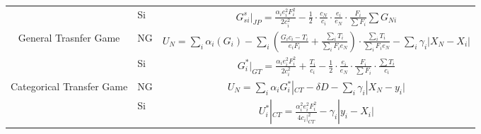 \begin{itemize}
\begin{table}[htbp]
\begin{tabular}{clc}
        \cmidrule{2-3}                                             & \multicolumn{1}{l}{\multirow{2}[2]{*}{Si}} & \multirow{2}[2]{*}{$G_{si}^{s}|_{JP}=\frac{\alpha_ie_i^2F_i^2}{2c_i^2}-\frac{1}{2}\cdot\frac{c_N}{c_i}\cdot\frac{e_i}{e_N}\cdot\frac{F_i}{\sum F_i}\sum G_{Ni}$}           \\
                                                                   &                                            &                                                                                                                                                                            \\
        \midrule
        \multirow{3}[4]{*}{General Trasnfer Game}                  & \multicolumn{1}{p{2.855em}}{NG}            & $U_N=\sum_i \alpha_i(G_i)-\sum_i(\frac{G_ic_i-T_i}{e_iF_i}+\frac{\sum_iT_i}{\sum_iF_ie_N})\cdot \frac{\sum_iT_i}{\sum_iF_ie_N}-\sum_i \gamma_i|X_N-X_i| $                  \\
        \cmidrule{2-3}                                             & \multicolumn{1}{l}{\multirow{2}[2]{*}{Si}} & \multirow{2}[2]{*}{$G_i^*|_{GT}=\frac{\alpha_i e_i^2F_i^2}{2c_i^2}+\frac{T_i}{c_i}-\frac{1}{2}\cdot \frac{e_i}{e_N}\cdot \frac{F_i}{\sum F_i} \cdot \frac{\sum T_i}{c_i}$} \\
                                                                   &                                            &                                                                                                                                                                            \\
        \midrule
        \multirow{3}[4]{*}{Categorical Transfer Game}              & \multicolumn{1}{p{2.855em}}{NG}            & $U_N=\sum_i \alpha_iG_i^*|_{CT}-\delta D-\sum_i \gamma_i |X_N-y_i|  $                                                                                                      \\
        \cmidrule{2-3}                                             & \multicolumn{1}{l}{\multirow{2}[2]{*}{Si}} & \multirow{2}[2]{*}{ $U_i^*|_{CT}=\frac{\alpha_i^2 e_i^2 F_i^2}{4c_i|_{CT}^2}-\gamma_i|y_i-X_i|$}                                                                           \\
                                                                   &                                            &                                                                                                                                                                            \\
        \bottomrule
    \end{tabular}%
    \label{utilitytable}%
\end{table}%


\end{itemize}
